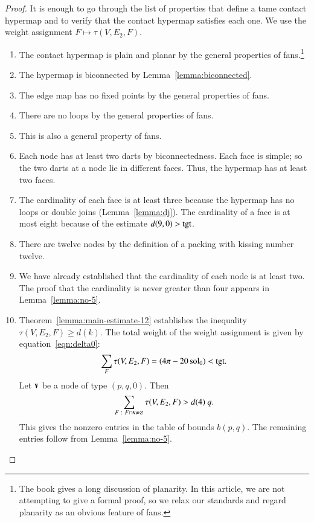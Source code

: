 \documentclass{llncs}
\def\op#1{{\hbox{#1}}}
\begin{document}
\begin{proof} It is enough to go through the list of properties that
  define a tame contact hypermap and to verify that the contact
  hypermap satisfies each one.  We use the weight assignment $F\mapsto
  \tau(V,E_{2},F)$.

\begin{enumerate}
\item {} The contact hypermap is plain and planar by the
  general properties of fans.\footnote{The book \cite{DSP} gives a long
    discussion of planarity.  In this article, we are not attempting
    to give a formal proof, so we relax our standards and
    regard planarity as an obvious feature of fans.}
\item {} The hypermap is biconnected by
  Lemma~\ref{lemma:biconnected}.
\item {} The
  edge map has no fixed points by the general properties of fans.
\item {} 
  There are no loops by the general properties of
  fans.
\item {} This is also a general property of fans.
\item {} Each node has at least two darts by
  biconnectedness. Each face is simple; so the two darts at a node lie
  in different faces.  Thus, the hypermap has at least two faces.
\item {} The cardinality of each face is at least three
  because the hypermap has no loops or double joins (Lemma~\ref{lemma:dj}).
  The cardinality of a face is at most eight because of the estimate
  $d(9,0)>\op{tgt}$.
\item {} There are twelve nodes by the definition of a
  packing with kissing number twelve.
\item {} We have already established that the cardinality
  of each node is at least two.  The proof that the cardinality is
  never  greater than four appears in Lemma~\ref{lemma:no-5}.
\item {} Theorem~\ref{lemma:main-estimate-12} establishes 
 the inequality $\tau(V,E_{2},F)\ge d(k)$.
  The total weight of the weight assignment is given by
  equation~\eqref{eqn:delta0}:
\[
  \sum_F \tau(V,E_{2},F) = (4\pi - 20\sol_0) < \op{tgt}.
\]
%
Let ${\mathbf v}$ be a node of type $(p,q,0)$.  
Then
\[
\sum_{F\ :\  F\cap {\mathbf v}\ne\varnothing}\tau(V,E_{2},F) > d(4)~q.
\]
This gives the nonzero entries in the table of bounds $b(p,q)$.  The
remaining entries follow from Lemma~\ref{lemma:no-5}.
\end{enumerate}
\end{proof}
\end{document}
